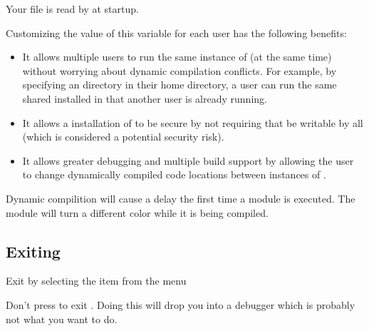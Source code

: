 Your  file is read by \sr{} at startup.

Customizing the value of this variable for each \sr{} user has
the following benefits:

\begin{itemize}
\item It allows multiple users to run the same instance of \sr{} (at
  the same time) without worrying about dynamic compilation conflicts.
  For example, by specifying an 
  directory in their home directory, a user can run the same shared
  \sr{} installed in  that another user
  is already running.

\item It allows a  installation of \sr{}
  to be secure by not requiring that
   be writable by
  all (which is considered a potential security risk).

\item It allows greater debugging and multiple build support by
  allowing the user to change dynamically compiled code locations
  between instances of \sr{}.

\end{itemize}

Dynamic compilition will cause a delay the first time a module is
executed.  The module will turn a different color while it is being
compiled.

\subsection{Exiting \sr{}}
\label{sec:stopping}

Exit \sr{} by selecting the  item from the  menu

Don't press  to exit \sr{}.  Doing this will drop
you into a debugger which is probably not what you want to do.


